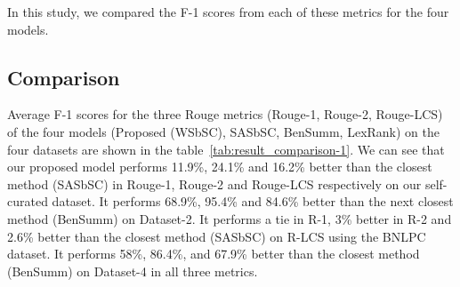 In this study, we compared the F-1 scores from each of these metrics for the four models.

\subsection{Comparison}\label{subsec:comparison}
Average F-1 scores for the three Rouge metrics (Rouge-1, Rouge-2, Rouge-LCS) of the four models (Proposed (WSbSC), SASbSC, BenSumm, LexRank) on the four datasets are shown in the table~\ref{tab:result_comparison-1}. We can see that our proposed model performs 11.9\%, 24.1\% and 16.2\% better than the closest method (SASbSC) in Rouge-1, Rouge-2 and Rouge-LCS respectively on our self-curated dataset. It performs 68.9\%, 95.4\% and 84.6\% better than the next closest method (BenSumm) on Dataset-2. It performs a tie in R-1, 3\% better in R-2 and 2.6\% better than the closest method (SASbSC) on R-LCS using the BNLPC dataset. It performs 58\%, 86.4\%, and 67.9\% better than the closest method (BenSumm) on Dataset-4 in all three metrics.\\

